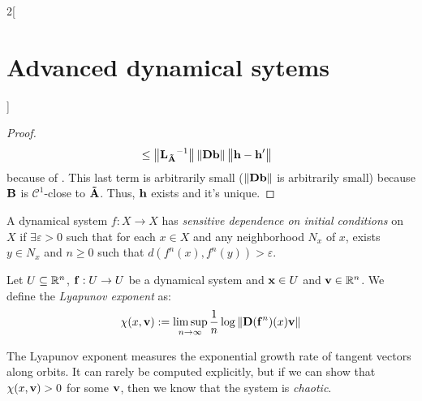 \documentclass[../../../main_math.tex]{subfiles}
\begin{document}
\begin{multicols}{2}[\section{Advanced dynamical sytems}]
\begin{proof}
\begin{align*}
                                              & \leq \left\|{\boldsymbol{\mathrm{L}}_{\boldsymbol{\mathrm{\tilde{A}}}}}^{-1}\right\|\left\|\boldsymbol{\mathrm{Db}}\right\|\left\|\boldsymbol{\mathrm{h}}-\boldsymbol{\mathrm{h}}'\right\|
    \end{align*}
    because of . This last term is arbitrarily small ($\left\|\boldsymbol{\mathrm{Db}}\right\|$ is arbitrarily small) because $\boldsymbol{\mathrm{B}}$ is $\mathcal{C}^1$-close to $\boldsymbol{\mathrm{\tilde{A}}}$. Thus, $\boldsymbol{\mathrm{h}}$ exists and it's unique.
  \end{proof}
  \begin{definition}
    A dynamical system $f : X\rightarrow X$ has \emph{sensitive dependence on initial conditions} on $X$ if $\exists\varepsilon >0$ such that for each $x\in X$ and any neighborhood $N_x$ of $x$, exists $y \in N_x$ and $n \geq  0$ such that $d(f^n(x),f^n(y)) > \varepsilon$.
  \end{definition}
  \begin{definition}
    Let $U\subseteq \mathbb{R}^n$, $\boldsymbol{\mathrm{f}}:U\to U$ be a dynamical system and $\boldsymbol{\mathrm{x}}\in U$ and $\boldsymbol{\mathrm{v}}\in\mathbb{R}^n$. We define the \emph{Lyapunov exponent} as:
    $$
      \chi(x,\boldsymbol{\mathrm{v}}):=\limsup_{n\to\infty}\frac{1}{n}\log\left\|\boldsymbol{\mathrm{D}}(\boldsymbol{\mathrm{f}}^n)(x)\boldsymbol{\mathrm{v}}\right\|
    $$
  \end{definition}
  \begin{remark}
    The Lyapunov exponent measures the exponential growth rate of tangent vectors along orbits. It can rarely be computed explicitly, but if we can show that $\chi(x,\boldsymbol{\mathrm{v}})>0$ for some $\boldsymbol{\mathrm{v}}$, then we know that the system is \emph{chaotic}.
  \end{remark}

\end{multicols}
\end{document}

